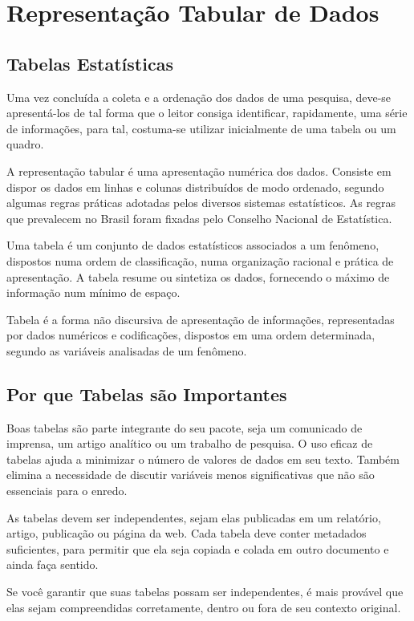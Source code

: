 \chapter{Representação Tabular de Dados}
\section{Tabelas Estatísticas}

\inic Uma vez concluída a coleta e a ordenação dos dados de uma pesquisa, deve-se apresentá-los de tal forma que o leitor consiga identificar, rapidamente, uma série de informações, para tal, costuma-se utilizar inicialmente de uma tabela ou um quadro.\vskip0.3cm

\inic A representação tabular é uma apresentação numérica dos dados. Consiste em dispor os dados em linhas e colunas distribuídos de modo ordenado, segundo algumas regras práticas adotadas pelos diversos sistemas estatísticos. As regras que prevalecem no Brasil foram fixadas pelo Conselho Nacional de Estatística.\vskip0.3cm

\inic Uma tabela é um conjunto de dados estatísticos associados a um fenômeno, dispostos numa ordem de classificação, numa organização racional e prática de apresentação. A tabela resume ou sintetiza os dados, fornecendo o máximo de informação num mínimo de espaço.\vskip0.3cm

\inic Tabela é a forma não discursiva de apresentação de informações, representadas por dados numéricos e codificações, dispostos em uma ordem determinada, segundo as variáveis analisadas de um fenômeno.

\section{Por que Tabelas são Importantes}

\inic Boas tabelas são parte integrante do seu pacote, seja um comunicado de imprensa, um artigo analítico ou um trabalho de pesquisa. O uso eficaz de tabelas ajuda a minimizar o número de valores de dados em seu texto. Também elimina a necessidade de discutir variáveis ​​menos significativas que não são essenciais para o enredo.\vskip0.3cm

As tabelas devem ser independentes, sejam elas publicadas em um relatório, artigo, publicação ou página da web. Cada tabela deve conter metadados suficientes, para permitir que ela seja copiada e colada em outro documento e ainda faça sentido.\vskip0.3cm

Se você garantir que suas tabelas possam ser independentes, é mais provável que elas sejam compreendidas corretamente, dentro ou fora de seu contexto original.\vst

